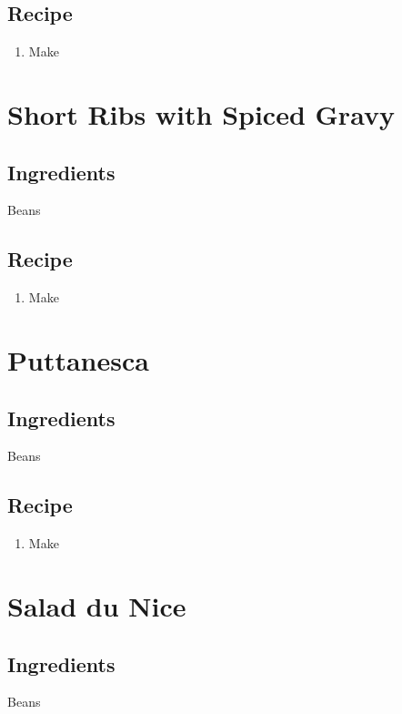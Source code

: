 \subsection*{Recipe}
\begin{enumerate}
    \item Make
\end{enumerate}

\newpage
\section{Short Ribs with Spiced Gravy}
\subsection*{Ingredients}
\begin{ingredients}
    \item Beans
\end{ingredients}
\subsection*{Recipe}
\begin{enumerate}
    \item Make
\end{enumerate}

\newpage
\section{Puttanesca}
\subsection*{Ingredients}
\begin{ingredients}
    \item Beans
\end{ingredients}
\subsection*{Recipe}
\begin{enumerate}
    \item Make
\end{enumerate}

\newpage
\section{Salad du Nice}
\subsection*{Ingredients}
\begin{ingredients}
    \item Beans
\end{ingredients}
